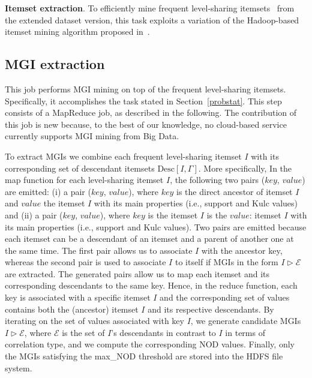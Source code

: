 \documentclass[10pt, conference, compsocconf]{IEEEtran}
\begin{document}
\noindent \textbf{Itemset extraction}. To efficiently mine frequent level-sharing itemsets~\cite{Han1999} from the extended dataset version, 
this task exploits a variation of the Hadoop-based itemset mining algorithm proposed in~\cite{ISPA13}. 


\subsection{MGI extraction}
\label{rulext}

This job performs MGI mining on top of the frequent level-sharing itemsets. 
Specifically, it accomplishes the task stated in Section~\ref{probstat}. 
This step consists of a MapReduce job, as described in the following.
The contribution of this job is new because, to the best of our knowledge, no cloud-based service currently supports MGI mining from Big Data.

To extract MGIs we combine each frequent level-sharing itemset $I$ with  
its corresponding set of descendant itemsets $\mbox{Desc}[I,\Gamma]$. 
More specifically, In the map function for each level-sharing itemset $I$, the following two pairs ($key$, $value$) are emitted:
(i) a pair ($key$, $value$), where $key$ is the direct ancestor of itemset $I$ and $value$ the itemset $I$ with its main properties (i.e., support and Kulc values) and
(ii) a pair ($key$, $value$), where $key$ is the itemset $I$ is the $value$: itemset $I$ with its main properties (i.e., support and Kulc values).
Two pairs are emitted because each itemset can be a descendant of an itemset and 
a parent of another one at the same time. The first pair allows us to associate $I$ with the ancestor key, whereas
the second pair is used to associate $I$ to itself if MGIs in the form $I \triangleright \mathcal{E}$ are extracted. 
The generated pairs allow us to map each itemset and its corresponding descendants to the same key. 
Hence, in the reduce function, each key is associated with a specific itemset $I$ and the corresponding set of values 
contains both the (ancestor) itemset $I$ and its respective descendants. By iterating on the set of values associated with key $I$, 
we generate candidate MGIs $I \triangleright \mathcal{E}$, where $\mathcal{E}$ is the set of $I$'s descendants in contrast to $I$ in terms of correlation type,
and we compute the corresponding NOD values. Finally, only the MGIs satisfying the max\_NOD threshold are stored into the HDFS file system.
\end{document}
